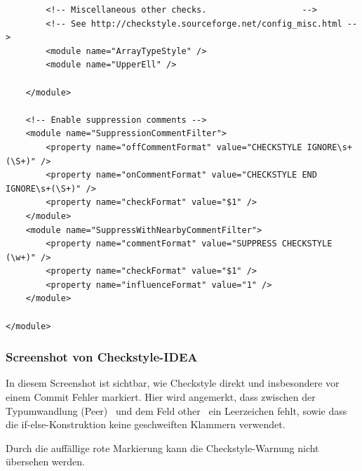 \begin{lstlisting}
        <!-- Miscellaneous other checks.                   -->
        <!-- See http://checkstyle.sourceforge.net/config_misc.html -->
        <module name="ArrayTypeStyle" />
        <module name="UpperEll" />

    </module>

    <!-- Enable suppression comments -->
    <module name="SuppressionCommentFilter">
        <property name="offCommentFormat" value="CHECKSTYLE IGNORE\s+(\S+)" />
        <property name="onCommentFormat" value="CHECKSTYLE END IGNORE\s+(\S+)" />
        <property name="checkFormat" value="$1" />
    </module>
    <module name="SuppressWithNearbyCommentFilter">
        <property name="commentFormat" value="SUPPRESS CHECKSTYLE (\w+)" />
        <property name="checkFormat" value="$1" />
        <property name="influenceFormat" value="1" />
    </module>

</module>
\end{lstlisting}








\subsubsection{Screenshot von Checkstyle-IDEA}

In diesem Screenshot ist sichtbar, wie Checkstyle direkt und insbesondere vor einem Commit Fehler markiert. Hier wird angemerkt, dass zwischen der Typumwandlung \glqq (Peer)\grqq~ und dem Feld \glqq other\grqq~ ein Leerzeichen fehlt, sowie dass die if-else-Konstruktion keine geschweiften Klammern verwendet.

Durch die auffällige rote Markierung kann die Checkstyle-Warnung nicht übersehen werden.


